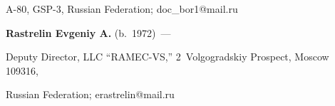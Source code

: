 A-80, GSP-3, Russian Federation; doc\_bor1@mail.ru





\vspace*{3pt}





\noindent


\textbf{Rastrelin Evgeniy A.} (b.\ 1972)~---


 Deputy Director, LLC ``RAMEC-VS,'' 2~Volgogradskiy  Prospect, Moscow 109316, 


 Russian Federation; erastrelin@mail.ru





      


 \label{end\stat}








\renewcommand{\bibname}{\protect\rm Литература}


